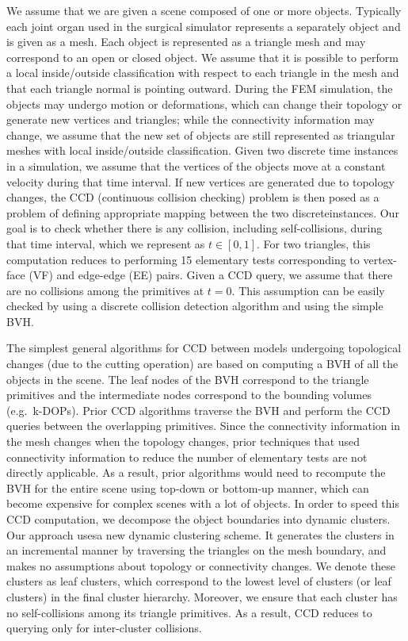 We assume that we are given a scene composed of one or more objects. Typically each joint organ used in the surgical simulator represents a separately object and is given as a mesh. Each object is represented as a triangle mesh and may correspond to an open or closed object. We assume that it is possible to perform a local inside/outside classification with respect to each triangle in the mesh and that each triangle normal is pointing outward. During the FEM simulation, the objects may undergo motion or deformations, which can change their topology or generate new vertices and triangles; while the connectivity information may change, we assume that the new set of objects are still represented as triangular meshes with local inside/outside classification. Given two discrete time instances in a simulation, we assume that the vertices of the objects move at a constant velocity during that time interval. If new vertices are generated due to topology changes, the CCD (continuous collision checking) problem is then posed as a problem of defining appropriate mapping between the two discreteinstances. Our goal is to check whether there is any collision, including self-collisions, during that time interval, which we represent as $t \in [0, 1]$. For two triangles, this computation reduces to performing 15 elementary tests corresponding to vertex-face (VF) and edge-edge (EE) pairs. Given a CCD query, we assume that there are no collisions among the primitives at $t = 0$. This assumption can be easily checked by using a discrete collision detection algorithm and using the simple BVH.

The simplest general algorithms for CCD between models undergoing topological changes (due to the cutting operation) are based on computing a BVH of all the objects in the scene. The leaf nodes of the BVH correspond to the triangle primitives and the intermediate nodes correspond to the bounding volumes (e.g.\ k-DOPs). Prior CCD algorithms traverse the BVH and perform the CCD queries between the overlapping primitives. Since the connectivity information in the mesh changes when the topology changes, prior techniques that used connectivity information to reduce the number of elementary tests are not directly applicable. As a result, prior algorithms would need to recompute the BVH for the entire scene using top-down or bottom-up manner, which can become expensive for complex scenes with a lot of objects. In order to speed this CCD computation, we decompose the object boundaries into dynamic clusters. Our approach usesa new dynamic clustering scheme. It generates the clusters in an incremental manner by traversing the triangles on the mesh boundary, and makes no assumptions about topology or connectivity changes. We denote these clusters as leaf clusters, which correspond to the lowest level of clusters (or leaf clusters) in the final cluster hierarchy. Moreover, we ensure that each cluster has no self-collisions among its triangle primitives. As a result, CCD reduces to querying only for inter-cluster collisions.

